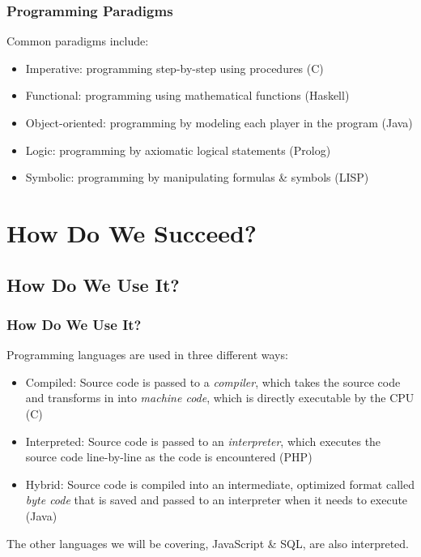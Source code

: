 \documentclass[aspectratio=169]{beamer}
\begin{document}
\begin{frame}
\frametitle{Programming Paradigms}
Common paradigms include:
\begin{itemize}
	\item Imperative: programming step-by-step using procedures (C)
	\pause
	\item Functional: programming using mathematical functions (Haskell)
	\pause
	\item Object-oriented: programming by modeling each player in the program (Java)
	\pause
	\item Logic: programming by axiomatic logical statements (Prolog)
	\pause
	\item Symbolic: programming by manipulating formulas \& symbols (LISP)
\end{itemize}
\end{frame}

\section{How Do We Succeed?}
\subsection{How Do We Use It?}
\begin{frame}
\frametitle{How Do We Use It?}
Programming languages are used in three different ways:
\begin{itemize} 
	\item Compiled: Source code is passed to a \textit{compiler}, which takes the source code and transforms in into \textit{machine code}, which is directly executable by the CPU (C)
	\item Interpreted: Source code is passed to an \textit{interpreter}, which executes the source code line-by-line as the code is encountered (PHP)
	\item Hybrid: Source code is compiled into an intermediate, optimized format called \textit{byte code} that is saved and passed to an interpreter when it needs to execute (Java)
\end{itemize}
The other languages we will be covering, JavaScript \& SQL, are also interpreted.
\end{frame}
\end{document}
